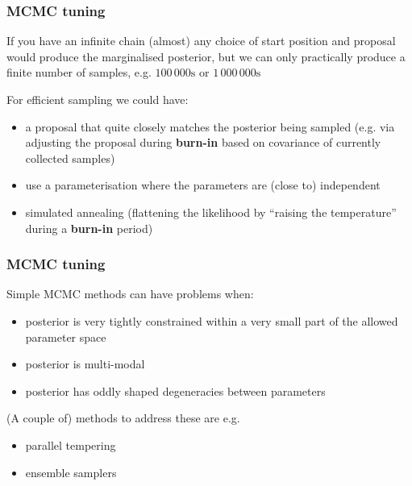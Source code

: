 \begin{frame}

\frametitle{MCMC tuning}
\label{mcmctuning}

If you have an infinite chain (almost) any choice of start position and proposal would
produce the marginalised posterior, but we can only practically produce a finite number
of samples, e.g. $100\,000\text{s}$ or $1\,000\,000\text{s}$

For efficient sampling we could have:

\begin{itemize}
\item a proposal that quite closely matches the posterior being sampled (e.g. via adjusting the proposal during \textbf{burn-in} based on covariance of currently collected samples)

\item use a parameterisation where the parameters are (close to) independent

\item simulated annealing (flattening the likelihood by ``raising the temperature'' during a \textbf{burn-in} period)

\end{itemize}

\end{frame}

\begin{frame}

\frametitle{MCMC tuning}
\label{mcmctuning}

Simple MCMC methods can have problems when:

\begin{itemize}
\item posterior is very tightly constrained within a very small part of the allowed parameter space

\item posterior is multi-modal

\item posterior has oddly shaped degeneracies between parameters

\end{itemize}

(A couple of) methods to address these are e.g.

\begin{itemize}
\item parallel tempering

\item ensemble samplers

\end{itemize}

\end{frame}

